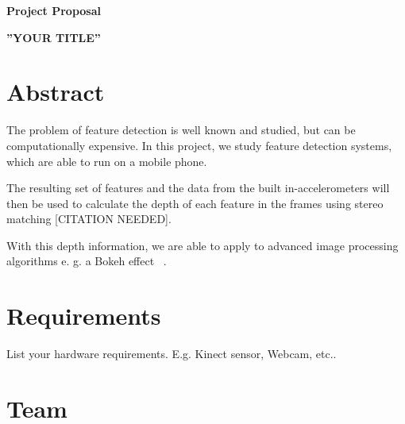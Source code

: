 \documentclass[a4paper,pagesize 10pt]{scrartcl}
\begin{document}
\begin{center}{\Huge\textbf{Project Proposal}}\end{center}
\begin{center}{\Large\textbf{''YOUR TITLE''}}\end{center}

\section{Abstract}

%
%
%
%
%
The problem of feature detection is well known and studied, but can be computationally expensive. In this project, we study feature detection systems, which are able to run on a mobile phone. 

The resulting set of features and the data from the built in-accelerometers will then be used to calculate the depth of each feature in the frames using stereo matching [CITATION NEEDED]. 

With this depth information, we are able to apply to advanced image processing algorithms e. g. a Bokeh effect ~\cite{Hu2013}.


\section{Requirements}
List your hardware requirements. E.g. Kinect sensor, Webcam, etc..

\section{Team}



{\small
	
	
}
\end{document}
